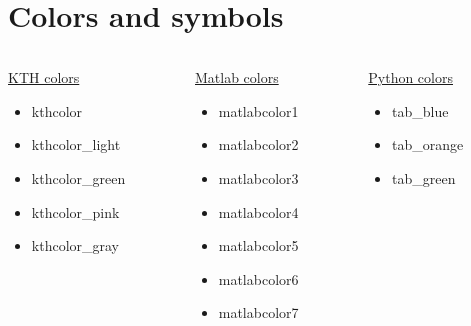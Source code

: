 \documentclass[aspectratio=169,11pt]{beamer}
\begin{document}
\section{Colors and symbols}
\begin{frame}{\insertsection}
    \begin{columns}[t]
        \begin{column}{0.24\textwidth}
            \underline{KTH colors}
            \begin{itemize}
                \item \textcolor{kthcolor}{kthcolor}
                \item \textcolor{kthcolor_light}{kthcolor\_light}
                \item \textcolor{kthcolor_green}{kthcolor\_green}
                \item \textcolor{kthcolor_pink}{kthcolor\_pink}
                \item \textcolor{kthcolor_gray}{kthcolor\_gray}
            \end{itemize}
        \end{column}
        \begin{column}{0.24\textwidth}
            \underline{Matlab colors}
            \begin{itemize}
                \item \textcolor{matlabcolor1}{matlabcolor1}
                \item \textcolor{matlabcolor2}{matlabcolor2}
                \item \textcolor{matlabcolor3}{matlabcolor3}
                \item \textcolor{matlabcolor4}{matlabcolor4}
                \item \textcolor{matlabcolor5}{matlabcolor5}
                \item \textcolor{matlabcolor6}{matlabcolor6}
                \item \textcolor{matlabcolor7}{matlabcolor7}
            \end{itemize}
        \end{column}
        \begin{column}{0.24\textwidth}
            \underline{Python colors}
            \begin{itemize}
            \item \textcolor{tab_blue}{tab\_blue}
            \item \textcolor{tab_orange}{tab\_orange}
            \item \textcolor{tab_green}{tab\_green}

\end{itemize}
\end{column}
\end{columns}
\end{frame}
\end{document}
